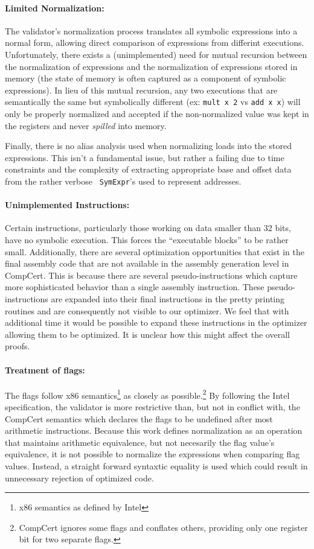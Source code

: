 \documentclass{article}
\begin{document}
\paragraph{Limited Normalization: }The validator's normalization
process translates all symbolic expressions into a normal form,
allowing direct comparison of expressions from differint executions.
Unfortunately, there exists a (unimplemented) need for mutual
recursion between the normalization of expressions and the
normalization of expressions stored in memory (the state of memory is
often captured as a component of symbolic expressions).  In lieu of
this mutual recursion, any two executions that are semantically the
same but symbolically different (ex: {\tt mult x 2} vs {\tt add x x})
will only be properly normalized and accepted if the non-normalized
value was kept in the registers and never {\it spilled} into memory.

Finally, there is no alias analysis used when normalizing loads into
the stored expressions.  This isn't a fundamental issue, but rather a
failing due to time constraints and the complexity of extracting
appropriate base and offset data from the rather verbose {\tt
  SymExpr}'s used to represent addresses.

\paragraph{Unimplemented Instructions: }
Certain instructions, particularly those working on data smaller than
32 bits, have no symbolic execution. This forces the ``executable
blocks'' to be rather small. Additionally, there are several
optimization opportunities that exist in the final assembly code that
are not available in the assembly generation level in CompCert. This
is because there are several pseudo-instructions which capture more
sophisticated behavior than a single assembly instruction. These
pseudo-instructions are expanded into their final instructions in the
pretty printing routines and are consequently not visible to our
optimizer. We feel that with additional time it would be possible to
expand these instructions in the optimizer allowing them to be
optimized. It is unclear how this might affect the overall proofs.

\paragraph{Treatment of flags: } 
The flags follow x86 semantics\footnote{x86 semantics as defined by
  Intel} as closely as possible.\footnote{CompCert ignores some flags
  and conflates others, providing only one register bit for two
  separate flags.}  By following the Intel specification, the
validator is more restrictive than, but not in conflict with, the
CompCert semantics which declares the flags to be undefined after most
arithmetic instructions.  Because this work defines normalization as
an operation that maintains arithmetic equivalence, but not necesarily
the flag value's equivalence, it is not possible to normalize the
expressions when comparing flag values.  Instead, a straight forward
syntaxtic equality is used which could result in unnecessary rejection
of optimized code.
\end{document}
